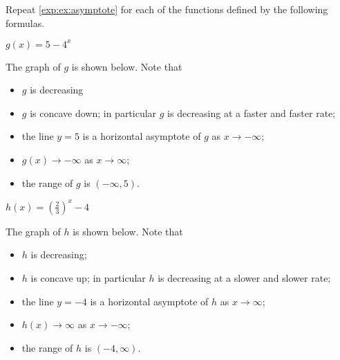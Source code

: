 \begin{doyouunderstand}
	\begin{problem}
	Repeat \cref{exp:ex:asymptote} for each of the functions defined 
	by the following formulas.
	\end{problem}
	\begin{multicols}{2}
		\begin{subproblem}[core]
			$g(x)=5-4^x$ 
			\begin{shortsolution}
				The graph of $g$ is shown below. Note that
				\begin{itemize}
					\item $g$ is decreasing
					\item $g$ is concave down; in particular $g$ is decreasing at a faster and faster rate;
					\item the line $y=5$ is a horizontal asymptote of $g$ as $x\rightarrow-\infty$;
					\item $g(x)\rightarrow-\infty$ as $x\rightarrow\infty$;
					\item the range of $g$ is $(-\infty,5)$.
				\end{itemize}
			\end{shortsolution}
		\end{subproblem}
		\begin{subproblem}
			$h(x)=\left( \frac{2}{3} \right)^x-4$
			\begin{shortsolution}
				The graph of $h$ is shown below. Note that
				\begin{itemize}
					\item $h$ is decreasing;
					\item $h$ is concave up; in particular $h$ is decreasing at a slower and slower rate;
					\item the line $y=-4$ is a horizontal asymptote of $h$ as $x\rightarrow\infty$;
					\item $h(x)\rightarrow\infty$ as $x\rightarrow-\infty$;
					\item the range of $h$ is $(-4,\infty)$.

\end{itemize}
\end{shortsolution}
\end{subproblem}
\end{multicols}
\end{doyouunderstand}

